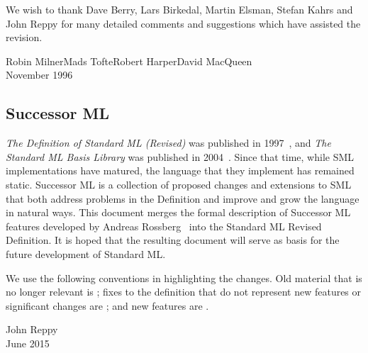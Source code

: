 

We wish to thank Dave Berry, Lars Birkedal, Martin Elsman, Stefan Kahrs
and John Reppy for many detailed comments and suggestions which have assisted
the revision.

\begin{flushright}
Robin Milner\quad Mads Tofte\quad Robert Harper\quad David MacQueen\\[1cm]
November 1996
\end{flushright}

{}

\subsection*{Successor ML}
{\it The Definition of Standard ML (Revised)} was published in 1997~\cite{sml97-definition}, and
{\it The Standard ML Basis Library} was published in 2004~\cite{sml-basis-lib}.
Since that time, while SML implementations have matured, the language that they
implement has remained static.
Successor ML is a collection of proposed changes and extensions to SML that both
address problems in the Definition and improve and grow the language in natural ways.
This document merges the formal description of Successor ML features developed
by Andreas Rossberg~\cite{hamlet-s} into the Standard ML Revised Definition.
It is hoped that the resulting document will serve as basis for the future development
of Standard ML.

We use the following conventions in highlighting the changes.
Old material that is no longer relevant is ; fixes to the
definition that do not represent new features or significant changes are
; and new features are .

\begin{flushright}
John Reppy\\[1cm]
June 2015
\end{flushright}
